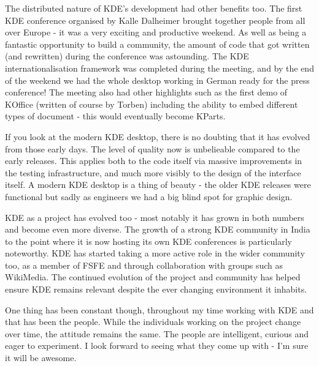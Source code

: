 The distributed nature of KDE's development had other benefits too. The first KDE conference organised by Kalle Dalheimer brought together people from all over Europe - it was a very exciting and productive weekend. As well as being a fantastic opportunity to build a community, the amount of code that got written (and rewritten) during the conference was astounding. The KDE internationalisation framework was completed during the meeting, and by the end of the weekend we had the whole desktop working in German ready for the press conference! The meeting also had other highlights such as the first demo of KOffice (written of course by Torben) including the ability to embed different types of document - this would eventually become KParts.

If you look at the modern KDE desktop, there is no doubting that it has evolved from those early days. The level of quality now is unbelieable compared to the early releases. This applies both to the code itself via massive improvements in the testing infrastructure, and much more visibly to the design of the interface itself. A modern KDE desktop is a thing of beauty - the older KDE releases were functional but sadly as engineers we had a big blind spot for graphic design.

KDE as a project has evolved too - most notably it has grown in both numbers and become even more diverse. The growth of a strong KDE community in India to the point where it is now hosting its own KDE conferences is particularly noteworthy. KDE has started taking a more active role in the wider community too, as a member of FSFE and through collaboration with groups such as WikiMedia. The continued evolution of the project and community has helped ensure KDE remains relevant despite the ever changing environment it inhabits.

One thing has been constant though, throughout my time working with KDE and that has been the people. While the individuals working on the project change over time, the attitude remains the same. The people are intelligent, curious and eager to experiment. I look forward to seeing what they come up with - I'm sure it will be awesome.

